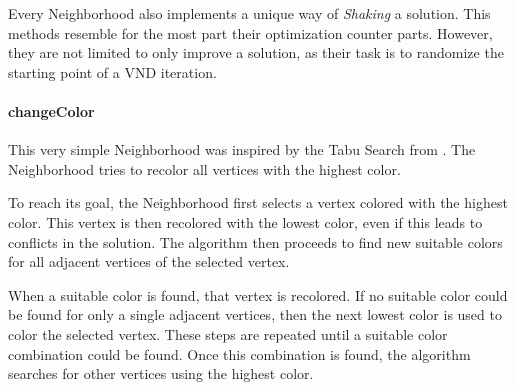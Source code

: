 \documentclass[paper=a4,fontsize=12pt]{scrartcl}
\begin{document}
Every Neighborhood also implements a unique way of \emph{Shaking} a solution. This methods resemble for the most part their optimization counter parts. However, they are not limited to only improve a solution, as their task is to randomize the starting point of a VND iteration.


\paragraph{changeColor}
This very simple Neighborhood was inspired by the Tabu Search from \citet*{Noronha2006}. The Neighborhood tries to recolor all vertices with the highest color.


To reach its goal, the Neighborhood first selects a vertex colored with the highest color. This vertex is then recolored with the lowest color, even if this leads to conflicts in the solution. The algorithm then proceeds to find new suitable colors for all adjacent vertices of the selected vertex. 


When a suitable color is found, that vertex is recolored. If no suitable color could be found for only a single adjacent vertices, then the next lowest color is used to color the selected vertex. These steps are repeated until a suitable color combination could be found. Once this combination is found, the algorithm searches for other vertices using the highest color.

\end{document}
